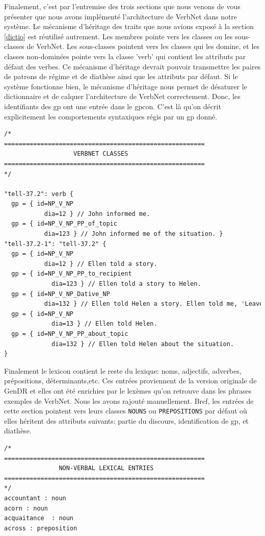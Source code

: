 Finalement, c'est par l'entremise des trois sections que nous venons de vous présenter que nous avons implémenté l'architecture de VerbNet dans notre système. Le mécanisme d'héritage des traits que nous avions exposé à la section \ref{dictio} est réutilisé autrement. Les membres pointe vers les classes ou les sous-classes de VerbNet. Les sous-classes pointent vers les classes qui les domine, et les classes non-dominées pointe vers la classe 'verb' qui contient les attributs par défaut des verbes. Ce mécanisme d'héritage devrait pouvoir transmettre les paires de patrons de régime et de diathèse ainsi que les attributs par défaut. Si le système fonctionne bien, le mécanisme d'héritage nous permet de désaturer le dictionnaire et de calquer l'architecture de VerbNet correctement. Donc, les identifiants des gp ont une entrée dans le gpcon. C'est là qu'on décrit explicitement les comportements syntaxiques régis par un gp donné.

\begin{lstlisting}[language=XML, caption = Partie: Classes de VerbNet]
/*
=======================================================
                   VERBNET CLASSES
=======================================================
*/

"tell-37.2": verb {
  gp = { id=NP_V_NP  
	       dia=12 } // John informed me.
  gp = { id=NP_V_NP_PP_of_topic  
	       dia=123 } // John informed me of the situation. }
"tell-37.2-1": "tell-37.2" {
  gp = { id=NP_V_NP  
	       dia=12 } // Ellen told a story.
  gp = { id=NP_V_NP_PP_to_recipient 
		     dia=123 } // Ellen told a story to Helen.
  gp = { id=NP_V_NP_Dative_NP   
	       dia=132 } // Ellen told Helen a story. Ellen told me, 'Leave the room.'
  gp = { id=NP_V_NP
		     dia=13 } // Ellen told Helen.
  gp = { id=NP_V_NP_PP_about_topic
		     dia=132 } // Ellen told Helen about the situation.
}
\end{lstlisting}

Finalement le lexicon contient le reste du lexique: noms, adjectifs, adverbes, prépositions, déterminants,etc. Ces entrées proviennent de la version originale de GenDR \citep{lareau18} et elles ont été enrichies par le lexèmes qu'on retrouve dans les phrases exemples de VerbNet. Nous les avons rajouté manuellement. Bref, les entrées de cette section pointent vers leurs classes \texttt{NOUNS} ou \texttt{PREPOSITIONS} par défaut où elles héritent des attributs suivants: partie du discours, identification de gp, et diathèse.

\begin{lstlisting}[language=XML, caption = Partie: Unités lexicales non-verbales]
/*
=======================================================
               NON-VERBAL LEXICAL ENTRIES     
=======================================================
*/
accountant : noun
acorn : noun
acquaitance  : noun
across : preposition
\end{lstlisting}

